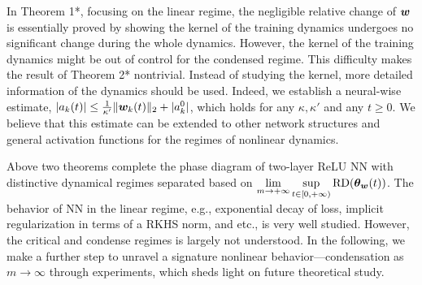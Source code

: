 \documentclass[twoside,11pt]{article}
\begin{document}
In Theorem 1*, focusing on the linear regime, the negligible relative change of $\bm{w}$ is essentially proved by showing the kernel of the training dynamics undergoes no significant change during the whole dynamics. However, the kernel of the training dynamics might be out of control for the condensed regime. This difficulty makes the result of Theorem 2* nontrivial. Instead of studying the kernel, more detailed information of the dynamics should be used. Indeed, we establish a neural-wise estimate, $\lvert a_k(t)\rvert\leq \frac{1}{\kappa'}\lVert\bm{w}_k(t)\rVert_2+\lvert a_k^0\rvert$, which holds for any $\kappa,\kappa'$ and any $t\geq 0$. We believe that this estimate can be extended to other network structures and general activation functions for the regimes of nonlinear dynamics.

Above two theorems complete the phase diagram of two-layer ReLU NN with distinctive dynamical regimes separated based on $\lim\limits_{m\to+\infty}\sup\limits_{t\in[0,+\infty)}\mathrm{RD}(\bm{\theta}_{\bm{w}}(t))$. The behavior of NN in the linear regime, e.g., exponential decay of loss, implicit regularization in terms of a RKHS norm, and etc., is very well studied. However, the critical and condense regimes is largely not understood. In the following, we make a further step to unravel a signature nonlinear behavior---condensation as $m\to\infty$ through experiments, which sheds light on future theoretical study.


\end{document}
